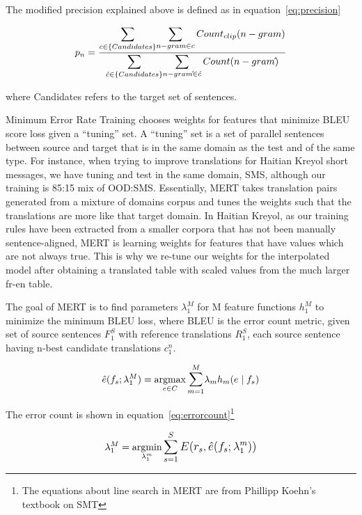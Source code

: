 The modified precision explained above is defined as in equation~\eqref{eq:precision}

\begin{equation} \label{eq:precision}
	p_{n} = \frac{\mathlarger{\sum\limits_{c \in \{Candidates\}}} \mathlarger{\sum\limits_{n-gram \in c}Count_{clip}(n-gram)}}
			{\mathlarger{\sum\limits_{\acute{c} \in \{Candidates\}}} \mathlarger{\sum\limits_{n-gram\acute{} \in \acute{c}}Count(n-gram\acute{})}}
\end{equation}

where Candidates refers to the target set of sentences. 

Minimum Error Rate Training chooses weights for features that minimize BLEU score loss given a ``tuning'' set. A ``tuning'' set is a set of parallel sentences between source and target that is in the same domain as the test and of the same type. For instance, when trying to improve translations for Haitian Kreyol short messages, we have tuning and test in the same domain, SMS, although our training is 85:15 mix of OOD:SMS. Essentially, MERT takes translation pairs generated from a mixture of domains corpus and tunes the weights such that the translations are more like that target domain. In Haitian Kreyol, as our training rules have been extracted from a smaller corpora that has not been manually sentence-aligned, MERT is learning weights for features that have values which are not always true. This is why we re-tune our weights for the interpolated model after obtaining a translated table with scaled values from the much larger fr-en table. 

The goal of MERT is to find parameters $\lambda_{1}^{M}$ for M feature functions $h_{1}^{M}$ to minimize the minimum BLEU loss, where BLEU is the error count metric, given set of source sentences $F_{1}^{S}$ with reference translations $R_{1}^{S}$, each source sentence having n-best candidate translations $c_{1}^{n}$. 

\begin{equation} \label{eq:maximization_mert}
	\hat{e}(f_{s};\lambda_{1}^M) = \argmax_{e \in C} \mathlarger\sum\limits_{m=1}^{M} \lambda_{m}h_{m}(e \mid f_{s})
\end{equation}



The error count is shown in equation~\eqref{eq:errorcount}\footnote{The equations about line search in MERT are from Phillipp Koehn's textbook on SMT}

\begin{equation} \label{eq:errorcount}
	\lambda_{1}^{M} = \argmin_{\lambda_{1}^{m}} \mathlarger{\sum\limits_{s=1}^{S}E(r_{s}, \hat{e}(f_{s};\lambda_{1}^{m}))}
\end{equation}

